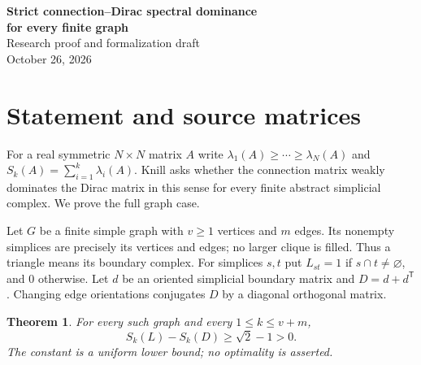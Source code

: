 \documentclass[11pt]{article}
\newtheorem{theorem}{Theorem}
\newcommand{\Sk}[2]{S_{#1}(#2)}
\begin{document}
\begin{center}
{\Large\bfseries Strict connection--Dirac spectral dominance\\for every finite graph}\\[.5em]
Research proof and formalization draft\\
October 26, 2026
\end{center}
\begin{abstract}
Let $L$ be the simplex-intersection connection matrix of a nonempty finite
graph, viewed as its vertex-and-edge simplicial complex, and let $D$ be its
signed simplicial Dirac matrix. For every $1\le k\le v+m$ we prove
$\Sk{k}{L}-\Sk{k}{D}\ge\sqrt2-1>0$, where $S_k$ sums the $k$ largest
eigenvalues with multiplicity, $v$ is the number of vertices, and $m$ the
number of edges. Isolated vertices and disconnected graphs are allowed.
This establishes, with a uniform strict gap, the dimension-at-most-one case
of Knill's connection--Dirac conjecture. The higher-dimensional conjecture
remains outside the result. The proof uses incidence matrices, orthonormal
eigenvector lifts, the Ky Fan variational principle, and scalar inequalities.
\end{abstract}

\section{Statement and source matrices}
For a real symmetric $N\times N$ matrix $A$ write
$\lambda_1(A)\ge\cdots\ge\lambda_N(A)$ and
$\Sk{k}{A}=\sum_{i=1}^k\lambda_i(A)$.
Knill \cite[Conjecture~1, \S5.3]{K26} asks whether the connection matrix
weakly dominates the Dirac matrix in this sense for every finite abstract
simplicial complex. We prove the full graph case.

Let $G$ be a finite simple graph with $v\ge1$ vertices and $m$ edges.
Its nonempty simplices are precisely its vertices and edges; no larger
clique is filled. Thus a triangle means its boundary complex.
For simplices $s,t$ put $L_{st}=1$ if $s\cap t\ne\varnothing$, and $0$
otherwise. Let $d$ be an oriented simplicial boundary matrix and
$D=d+d^{\mathsf T}$.
Changing edge orientations conjugates $D$ by a diagonal orthogonal matrix.
\begin{theorem}\label{main}
For every such graph and every $1\le k\le v+m$,
\[
 \Sk{k}{L}-\Sk{k}{D}\ge\sqrt2-1>0.
\]
The constant is a uniform lower bound; no optimality is asserted.
\end{theorem}
\end{document}
